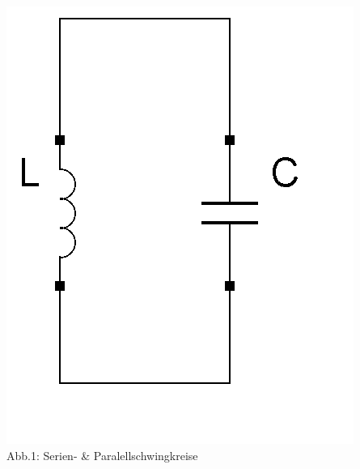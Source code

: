 \begin{frame}
\begin{center}
		\includegraphics[scale=0.4]{a04/Schwingkreis_parallel.png}\\
		Abb.1: Serien- \& Paralellschwingkreise
	\end{center}
\end{frame}

